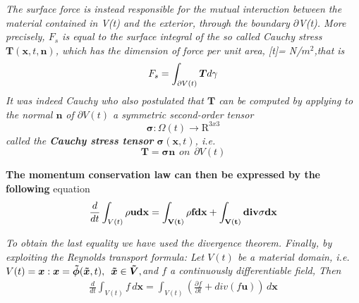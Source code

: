 \documentclass[11pt,letterpaper]{article}
\begin{document}
\textit{The surface force is instead responsible for the mutual interaction between the material contained in V(t) and the exterior, through the boundary $\partial$V(t). More precisely, $F_s$ is equal to the surface integral of the so called Cauchy
stress $\bm{T}(\bm{x}, t, \bm{n})$, which has the dimension of force per unit area, [t]= N/$m^2$,that is
\begin{equation}
    F_s =  \int_{\partial V(t)} \bm{T} d\bf{\gamma}
\end{equation}
It was indeed Cauchy who also postulated that $\bm{T}$ can be computed by
applying to the normal $\bm{n}$ of $\partial V(t)$ a symmetric second-order tensor
\begin{equation}
    \bm{\sigma} : \Omega(t) \longrightarrow \mathrm{R}^{3x3}
\end{equation}
called the \textbf{Cauchy stress tensor} $\bm{\sigma}(\bm{x},t)$, i.e.
\begin{equation}
    \bm{T} = \bm{\sigma}\bm{n} \hspace{5pt} on \hspace{5pt}  \partial V(t)
\end{equation}
}

{\color{red}\textbf{The momentum conservation law can then be expressed by the following}}
equation \begin{equation}
     \frac{d}{dt} \int_{V(t)} \rho \bf{u} d\bf{x} = \int_{V(t)} \rho \bf{f} d\bf{x} + \int_{V(t)} div \bf{\sigma} d\bf{x}
\end{equation}

\textit{To obtain the last equality we have used the divergence theorem. Finally, by exploiting the Reynolds transport formula: \newline
  Let $V(t)$ be a material domain, i.e. $V(t)= \bm{x} : \bm{x}= \bm{\Tilde{\phi}}(\bm{\Tilde{x}},t), \hspace{5pt} \bm{\Tilde{x}} \in  \bm{\Tilde{V}},$and $f$ a   continuously differentiable field, Then
\begin{align}
 \frac{d}{dt}\int_{V(t)} f \hspace{2pt}d\bm{x} = \int_{V(t)} ( \frac{\partial f}{\partial t} + div(f\bm{u}) )\hspace{2pt} d\bm{x}
\end{align}
}
\end{document}
